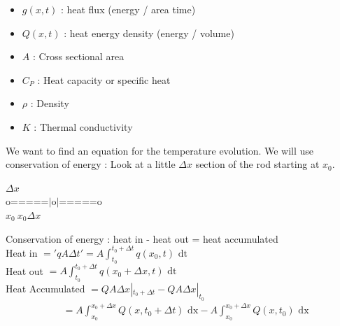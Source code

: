 \documentclass{article}
\begin{document}
\dfn
\begin{itemize}
  \item $g(x, t)$ : heat flux (energy / area time)
  \item $Q(x, t)$ : heat energy density (energy / volume)
  \item $A$ : Cross sectional area
  \item $C_P$ : Heat capacity or specific heat
  \item $\rho$ : Density
  \item $K$ : Thermal conductivity
\end{itemize}
We want to find an equation for the temperature evolution. We will use conservation of energy : Look at a little $\Delta x$ section of the rod starting at $x_0$.
\begin{center}
  $\Delta x$\\
  o=====$|$o$|$=====o\\
  $x_0\  x_0\Delta x$
\end{center}
Conservation of energy : heat in - heat out = heat accumulated\\
Heat in $ = 'qA\Delta t' = A \int_{t_0}^{t_0 + \Delta t} q(x_0, t) \text{ dt}$\\
Heat out $ = A\int_{t_0}^{t_0 + \Delta t} q(x_0 + \Delta x, t) \text{ dt}$\\
Heat Accumulated $ = QA\Delta x |_{t_0 + \Delta t} - QA\Delta x|_{t_0}$
\begin{align}
  & = A\int^{x_0 + \Delta x}_{x_0} Q(x, t_0 + \Delta t) \text{ dx} - A\int^{x_0 + \Delta x}_{x_0} Q(x, t_0) \text{ dx}
\end{align}
\newpage
\end{document}
